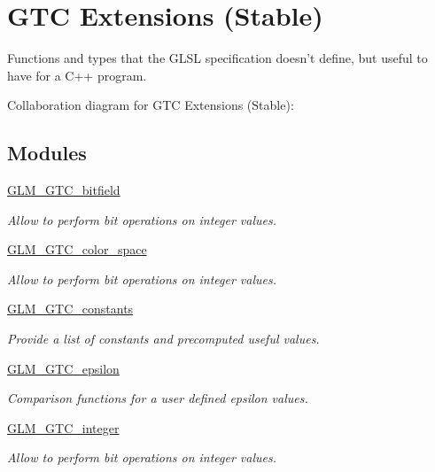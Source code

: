 \hypertarget{group__gtc}{\section{G\-T\-C Extensions (Stable)}
\label{group__gtc}
}


Functions and types that the G\-L\-S\-L specification doesn't define, but useful to have for a C++ program.  


Collaboration diagram for G\-T\-C Extensions (Stable)\-:
\subsection*{Modules}
\begin{DoxyCompactItemize}
\item 
\hyperlink{group__gtc__bitfield}{G\-L\-M\-\_\-\-G\-T\-C\-\_\-bitfield}
\begin{DoxyCompactList}\small\item\em Allow to perform bit operations on integer values. \end{DoxyCompactList}\item 
\hyperlink{group__gtc__color__space}{G\-L\-M\-\_\-\-G\-T\-C\-\_\-color\-\_\-space}
\begin{DoxyCompactList}\small\item\em Allow to perform bit operations on integer values. \end{DoxyCompactList}\item 
\hyperlink{group__gtc__constants}{G\-L\-M\-\_\-\-G\-T\-C\-\_\-constants}
\begin{DoxyCompactList}\small\item\em Provide a list of constants and precomputed useful values. \end{DoxyCompactList}\item 
\hyperlink{group__gtc__epsilon}{G\-L\-M\-\_\-\-G\-T\-C\-\_\-epsilon}
\begin{DoxyCompactList}\small\item\em Comparison functions for a user defined epsilon values. \end{DoxyCompactList}\item 
\hyperlink{group__gtc__integer}{G\-L\-M\-\_\-\-G\-T\-C\-\_\-integer}
\begin{DoxyCompactList}\small\item\em Allow to perform bit operations on integer values. \end{DoxyCompactList}\item 

\end{DoxyCompactItemize}
